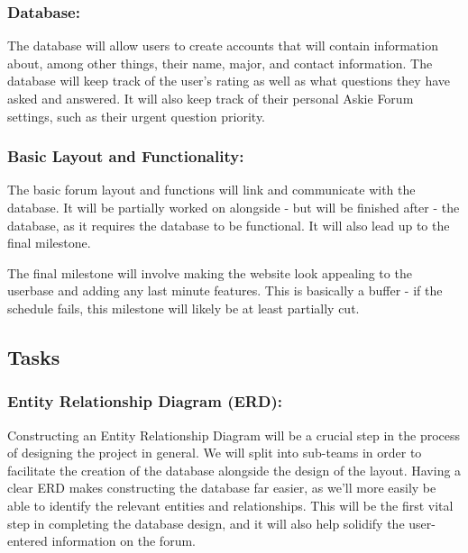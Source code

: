 \documentclass[12pt]{article}
\begin{document}
\subsubsection{Database:} 
\begin{flushleft}The database will allow users to create accounts that will contain information about, among other things, their name, major, and contact information. The database will keep track of the user's rating as well as what questions they have asked and answered. It will also keep track of their personal Askie Forum settings, such as their urgent question priority.
\end{flushleft}
\begin{flushleft}

\subsubsection{Basic Layout and Functionality:}
\begin{flushleft}The basic forum layout and functions will link and communicate with the database. It will be partially worked on alongside - but will be finished after - the database, as it requires the database to be functional. It will also lead up to the final milestone.
\end{flushleft}
\begin{flushleft}
The final milestone will involve making the website look appealing to the userbase and adding any last minute features. This is basically a buffer - if the schedule fails, this milestone will likely be at least partially cut.
\end{flushleft}

\subsection{Tasks}
\end{flushleft}
\subsubsection{Entity Relationship Diagram (ERD):} 
\begin{flushleft}Constructing an Entity Relationship Diagram will be a crucial step in the process of designing the project in general. We will split into sub-teams in order to facilitate the creation of the database alongside the design of the layout. Having a clear ERD makes constructing the database far easier, as we'll more easily be able to identify the relevant entities and relationships. This will be the first vital step in completing the database design, and it will also help solidify the user-entered information on the forum. 
\end{flushleft}
\end{document}
